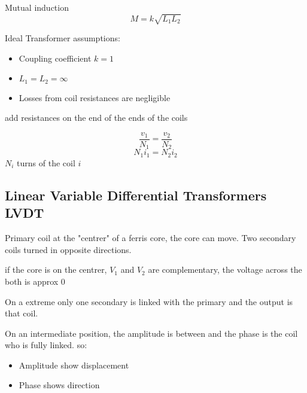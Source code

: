 \documentclass[]{article}
\begin{document}
Mutual induction 
$$M=k\sqrt{L_1L_2}$$

Ideal Transformer assumptions:
\begin{itemize}
	\item Coupling coefficient $k=1$
	\item $L_1=L_2=\infty$
	\item Losses from coil resistances are negligible
\end{itemize}

add resistances on the end of the ends of the coils

$$\frac{v_1}{N_1}=\frac{v_2}{N_2}$$
$$N_1i_1=N_2i_2 $$
$N_i$ turns of the coil $i$

\subsection{Linear Variable Differential Transformers LVDT}
Primary coil at the "centrer" of a ferris core, the core can move.
Two secondary coils turned in opposite directions.  

if the core is on the centrer, $V_1$ and $V_2$ are complementary, the voltage across the both is approx 0

On a extreme only one secondary is linked with the primary and the output is that coil.

On an intermediate position, the amplitude is between and the phase is the coil who is fully linked. so:
\begin{itemize}
	\item Amplitude show displacement
	\item Phase shows direction
\end{itemize} 
\end{document}
